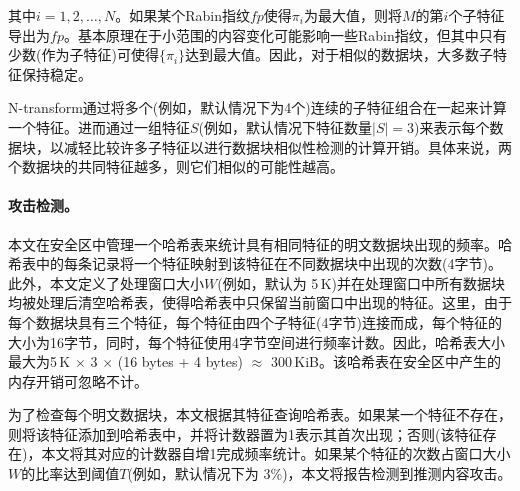 其中$i = 1, 2,\ldots, N$。如果某个Rabin指纹$fp$使得$\pi_i$为最大值，则将$M$的第$i$个子特征导出为$fp$。基本原理在于小范围的内容变化可能影响一些Rabin指纹，但其中只有少数(作为子特征)可使得$\{\pi_i\}$达到最大值。因此，对于相似的数据块，大多数子特征保持稳定。

N-transform通过将多个(例如，默认情况下为4个)连续的子特征组合在一起来计算一个特征。进而通过一组特征$S$(例如，默认情况下特征数量$|S| = 3$)来表示每个数据块，以减轻比较许多子特征以进行数据块相似性检测的计算开销。具体来说，两个数据块的共同特征越多，则它们相似的可能性越高。

\paragraph*{攻击检测。}

本文在安全区中管理一个哈希表来统计具有相同特征的明文数据块出现的频率。哈希表中的每条记录将一个特征映射到该特征在不同数据块中出现的次数(4字节)。此外，本文定义了处理窗口大小$W$(例如，默认为 5\,K)并在处理窗口中所有数据块均被处理后清空哈希表，使得哈希表中只保留当前窗口中出现的特征。这里，由于每个数据块具有三个特征，每个特征由四个子特征(4字节)连接而成，每个特征的大小为16字节，同时，每个特征使用4字节空间进行频率计数。因此，哈希表大小最大为5\,K $\times$ 3 $\times$ (16 bytes + 4 bytes) $\approx$ 300\,KiB。该哈希表在安全区中产生的内存开销可忽略不计。

为了检查每个明文数据块，本文根据其特征查询哈希表。如果某一个特征不存在，则将该特征添加到哈希表中，并将计数器置为1表示其首次出现；否则(该特征存在)，本文将其对应的计数器自增1完成频率统计。如果某个特征的次数占窗口大小$W$的比率达到阈值$T$(例如，默认情况下为 3\%)，本文将报告检测到推测内容攻击。
